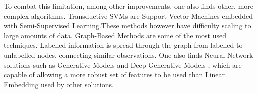 To combat this limitation, among other improvements, one also finds other, more complex algorithms. Transductive SVMs \citep{bennett1999semi} are Support Vector Machines embedded with Semi-Supervised Learning.These methods however have difficulty scaling to large amounts of data. Graph-Based Methods \citep{goldberg2006seeing, zhu2009introduction} are some of the most used techniques. Labelled information is spread through the graph from labelled to unlabelled nodes, connecting similar observations. One also finds Neural Network solutions such as Generative Models and Deep Generative Models \citep{zhu2009introduction, kingma2014semi}, which are capable of allowing a more robust set of features to be used than Linear Embedding used by other solutions.

